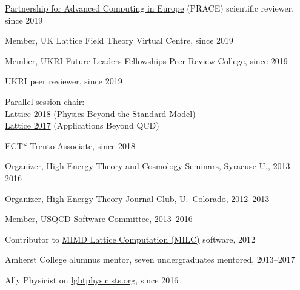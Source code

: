 \documentclass[10 pt]{article}
\newenvironment{tightlist}
  {\begin{list} {} {\setlength{\topsep}{-8 pt} \setlength{\itemsep}{-3 pt} \setlength{\leftmargin}{0 mm}}}{\end{list}}
\begin{document}
\vspace{-12 pt} %
\begin{tightlist}
  \item \href{http://www.prace-ri.eu}{Partnership for Advanced Computing in Europe} (PRACE) scientific reviewer, since 2019 \\ %
  \item Member, UK Lattice Field Theory Virtual Centre, since 2019                                                          \\
  \item Member, UKRI Future Leaders Fellowships Peer Review College, since 2019                                             \\ %
  \item UKRI peer reviewer, since 2019                                                                                      \\ %
  \item Parallel session chair:                                                                                             \\
    \qquad \href{https://web.pa.msu.edu/conf/Lattice2018/}{Lattice 2018} (Physics Beyond the Standard Model)                \\
    \qquad \href{http://wpd.ugr.es/~lattice2017/}{Lattice 2017} (Applications Beyond QCD)                                   \\
  \item \href{http://www.ectstar.eu}{ECT* Trento} Associate, since 2018                                                     \\ %
  \item Organizer, High Energy Theory and Cosmology Seminars, Syracuse U., 2013--2016                                       \\
  \item Organizer, High Energy Theory Journal Club, U.~Colorado, 2012--2013                                                 \\
  \item Member, USQCD Software Committee, 2013--2016                                                                        \\
  \item Contributor to \href{http://www.physics.utah.edu/~detar/milc/}{MIMD Lattice Computation (MILC)} software, 2012      \\
  \item Amherst College alumnus mentor, seven undergraduates mentored, 2013--2017                                           \\ %
  \item Ally Physicist on \href{http://lgbtphysicists.org}{lgbtphysicists.org}, since 2016                                  \\ %
\end{tightlist}
\end{document}
